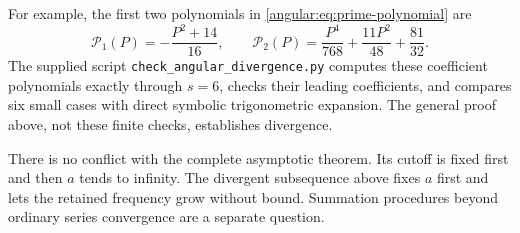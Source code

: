 For example, the first two polynomials in
\eqref{angular:eq:prime-polynomial} are
\[
 \mathcal P_1(P)=-\frac{P^2+14}{16},\qquad
 \mathcal P_2(P)=\frac{P^4}{768}+\frac{11P^2}{48}
                   +\frac{81}{32}.
\]
The supplied script \texttt{check\_angular\_divergence.py} computes
these coefficient polynomials exactly through $s=6$, checks their
leading coefficients, and compares six small cases with direct
symbolic trigonometric expansion. The general proof above, not
these finite checks, establishes divergence.

There is no conflict with the complete asymptotic theorem. Its
cutoff is fixed first and then $a$ tends to infinity. The divergent
subsequence above fixes $a$ first and lets the retained frequency
grow without bound. Summation procedures beyond ordinary series
convergence are a separate question.

